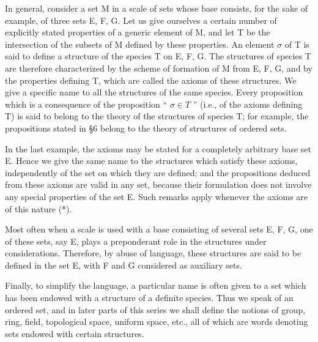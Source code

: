 In general, consider a set M in a scale of sets whose base consists, for the sake of example, of three sets E, F, G. Let us give ourselves a certain number of explicitly stated properties of a generic element of M, and let T be the intersection of the subsets of M defined by these properties. An element \(\sigma\) of T is said to define a structure of the species T on E, F, G. The structures of species T are therefore characterized by the scheme of formation of M from E, F, G, and by the properties defining T, which are called the axioms of these structures. We give a specific name to all the structures of the same species. Every proposition which is a consequence of the proposition `` \(\sigma \in T\) '' (i.e., of the axioms defining T) is said to belong to the theory of the structures of species T; for example, the propositions stated in §6 belong to the theory of structures of ordered sets.

In the last example, the axioms may be stated for a completely arbitrary base set E. Hence we give the same name to the structures which satisfy these axioms, independently of the set on which they are defined; and the propositions deduced from these axioms are valid in any set, because their formulation does not involve any special properties of the set E. Such remarks apply whenever the axioms are of this nature (*).

Most often when a scale is used with a base consisting of several sets E, F, G, one of these sets, say E, plays a preponderant role in the structures under considerations. Therefore, by abuse of language, these structures are said to be defined in the set E, with F and G considered as auxiliary sets.

Finally, to simplify the language, a particular name is often given to a set which has been endowed with a structure of a definite species. Thus we speak of an ordered set, and in later parts of this series we shall define the notions of group, ring, field, topological space, uniform space, etc., all of which are words denoting sets endowed with certain structures.

